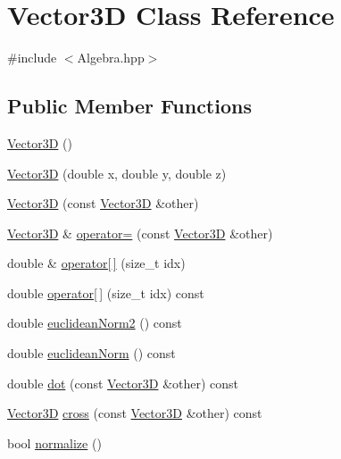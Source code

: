 \hypertarget{class_vector3_d}{\section{Vector3\-D Class Reference}
\label{class_vector3_d}
}


{\ttfamily \#include $<$Algebra.\-hpp$>$}

\subsection*{Public Member Functions}
\begin{DoxyCompactItemize}
\item 
\hyperlink{class_vector3_d_a0b11a8d75da427b27443d8a94d0d296c}{Vector3\-D} ()
\item 
\hyperlink{class_vector3_d_abd851542da40b1168edcad11fa83b7c2}{Vector3\-D} (double x, double y, double z)
\item 
\hyperlink{class_vector3_d_ab44979be6b9bb7b514faa44b1c287eb4}{Vector3\-D} (const \hyperlink{class_vector3_d}{Vector3\-D} \&other)
\item 
\hyperlink{class_vector3_d}{Vector3\-D} \& \hyperlink{class_vector3_d_af08b65a17f2ba541d715507e7d283a54}{operator=} (const \hyperlink{class_vector3_d}{Vector3\-D} \&other)
\item 
double \& \hyperlink{class_vector3_d_a29b51ae3f30747c5f1915dfb6d716263}{operator\mbox{[}$\,$\mbox{]}} (size\-\_\-t idx)
\item 
double \hyperlink{class_vector3_d_a3f0c34fddb342029b92f4edfd47c0136}{operator\mbox{[}$\,$\mbox{]}} (size\-\_\-t idx) const 
\item 
double \hyperlink{class_vector3_d_a0b88126c5cb26b88e9cd240215d51721}{euclidean\-Norm2} () const 
\item 
double \hyperlink{class_vector3_d_a79e5a852ed84bdb0f83a1cc1edcf6d8b}{euclidean\-Norm} () const 
\item 
double \hyperlink{class_vector3_d_adfea481bddc047a5a45454637e2018f9}{dot} (const \hyperlink{class_vector3_d}{Vector3\-D} \&other) const 
\item 
\hyperlink{class_vector3_d}{Vector3\-D} \hyperlink{class_vector3_d_a81310eb5d5bd8d28feff3daf6abae149}{cross} (const \hyperlink{class_vector3_d}{Vector3\-D} \&other) const 
\item 
bool \hyperlink{class_vector3_d_ae123dba26ebffc58cdc3484930179688}{normalize} ()
\end{DoxyCompactItemize}


